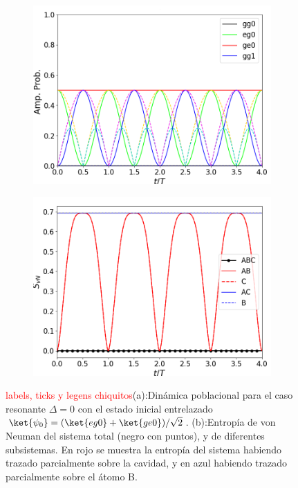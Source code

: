 \begin{figure}[h]
    \centering
    \begin{subfigure}{0.49\textwidth}
        \centering
        \includegraphics[width=\textwidth]{figuras/ch4/d eg0+ din ABC d=0.png}
        \caption{}
        \label{fig4:dinamica pob eg0 sim resonante}
    \end{subfigure}
    \hfill
    \begin{subfigure}{0.49\textwidth}
        \centering
        \includegraphics[width=\textwidth]{figuras/ch4/d eg0+ din svn d=0.png}
        \caption{}
        \label{fig4:dinamica svn eg0 sim resonante}
    \end{subfigure}
    \caption{\textcolor{red}{labels, ticks y legens chiquitos}(a):Dinámica poblacional para el caso resonante $\Delta=0$ con el estado inicial entrelazado $\ket{\psi_0}=(\ket{eg0} + \ket{ge0})/\sqrt{2}$. (b):Entropía de von Neuman del sistema total (negro con puntos), y de diferentes subsistemas. En rojo se muestra la entropía del sistema habiendo trazado parcialmente sobre la cavidad, y en azul habiendo trazado parcialmente sobre el átomo B.}
    \label{fig4:dinamica eg0 sim resonante}
\end{figure}

